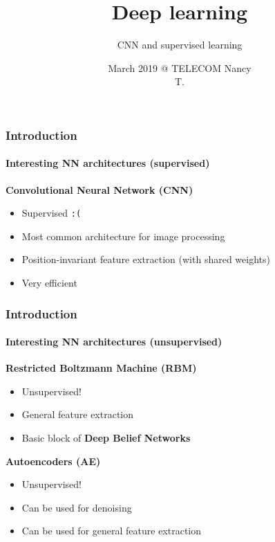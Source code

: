 \documentclass[]{beamer}
\begin{document}
\title{Deep learning}
\subtitle{CNN and supervised learning}
\author{March 2019 @ TELECOM Nancy\\T. }
\date{}

\begin{frame}
  \titlepage{}
\end{frame}


\begin{frame}
  \frametitle{Introduction}
  \framesubtitle{Interesting NN architectures (supervised)}
  \begin{block}{\bf{C}onvolutional \bf{N}eural \bf{N}etwork (CNN)}
    \begin{itemize}
      \item \alert{Supervised \tt{:(}}
      \item Most common architecture for image processing
      \item Position-invariant feature extraction (with shared weights)
      \item Very efficient
    \end{itemize}
  \end{block}
\end{frame}
\begin{frame}
  \frametitle{Introduction}
  \framesubtitle{Interesting NN architectures (unsupervised)}
  \begin{block}{\bf{R}estricted \bf{B}oltzmann \bf{M}achine (RBM)}
    \begin{itemize}
      \item \alert{Unsupervised!}
      \item General feature extraction
      \item Basic block of \bf{D}eep \bf{B}elief \bf{N}etworks
    \end{itemize}
  \end{block}
  \begin{block}{\bf{A}uto\bf{e}ncoders (AE)}
    \begin{itemize}
      \item \alert{Unsupervised!}
      \item Can be used for denoising
      \item Can be used for general feature extraction
    \end{itemize}
  \end{block}
\end{frame}
\end{document}
